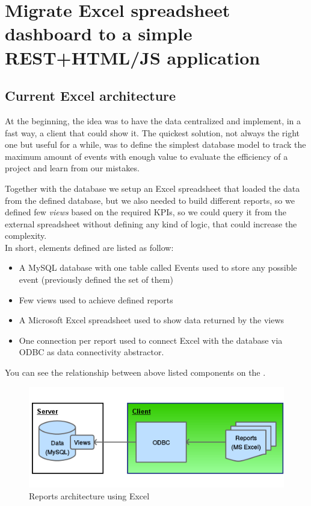 \part{Migrate Excel spreadsheet dashboard to a simple REST+HTML/JS
application}
\label{c_phaseone}

\chapter{Current Excel architecture}
At the beginning, the idea was to have the data centralized
\label{t_main_objective} and implement, in a fast way, a client that could show
it. The quickest solution, not always the right one but useful for a while, was
to define the simplest database model to  track the maximum amount of events
with enough value to evaluate the  efficiency of a project and learn from our
mistakes.

Together with the database  we setup an Excel spreadsheet that loaded
the data from the defined database, but  we also needed to build different
reports, so we defined few \emph{views} based  on the required KPIs, so we could
query it from the external spreadsheet  without defining any kind of logic,
that could increase the complexity.\\ 

In short, elements defined are listed as follow:
\begin{itemize}
  \item A MySQL database with one table called Events used to store any possible
  event (previously defined the set of them)
  \item Few views used to achieve defined reports
  \item A Microsoft Excel spreadsheet used to show data returned by the views
  \item One connection per report used to connect Excel with the database
  via ODBC as data connectivity abstractor. 
\end{itemize}

You can see the relationship between above listed components on the 
.
 
\begin{figure}[ht!]
	\centering
   	\includegraphics[width=1\textwidth]{./resources/excel_architecture.png}
   	\caption{Reports architecture using Excel}
   	\label{f_excel_architecture}
\end{figure}

